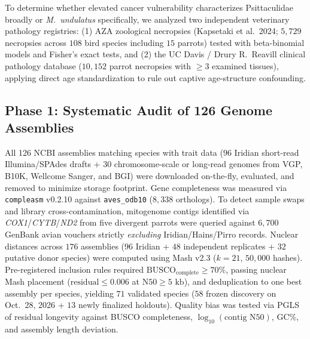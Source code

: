 \documentclass[10pt,a4paper,twocolumn]{article}
\begin{document}
To determine whether elevated cancer vulnerability characterizes Psittaculidae broadly or \textit{M.\ undulatus} specifically, we analyzed two independent veterinary pathology registries: (1) AZA zoological necropsies (Kapsetaki et al.\ 2024; $5,729$ necropsies across $108$ bird species including $15$ parrots) tested with beta-binomial models and Fisher's exact tests, and (2) the UC Davis / Drury R.\ Reavill clinical pathology database ($10,152$ parrot necropsies with $\ge 3$ examined tissues), applying direct age standardization to rule out captive age-structure confounding.

\subsection{Phase 1: Systematic Audit of 126 Genome Assemblies}
All 126 NCBI assemblies matching species with trait data ($96$ Iridian short-read Illumina/SPAdes drafts + $30$ chromosome-scale or long-read genomes from VGP, B10K, Wellcome Sanger, and BGI) were downloaded on-the-fly, evaluated, and removed to minimize storage footprint. Gene completeness was measured via \texttt{compleasm} v0.2.10 against \texttt{aves\_odb10} ($8,338$ orthologs). To detect sample swaps and library cross-contamination, mitogenome contigs identified via \textit{COX1}/\textit{CYTB}/\textit{ND2} from five divergent parrots were queried against $6,700$ GenBank avian vouchers strictly \textit{excluding} Iridian/Hains/Pirro records. Nuclear distances across $176$ assemblies ($96$ Iridian + $48$ independent replicates + $32$ putative donor species) were computed using Mash v2.3 ($k = 21$, $50,000$ hashes). Pre-registered inclusion rules required $\text{BUSCO}_{\text{complete}} \ge 70\%$, passing nuclear Mash placement ($\text{residual} \le 0.006$ at $\text{N50} \ge 5\text{ kb}$), and deduplication to one best assembly per species, yielding $71$ validated species ($58$ frozen discovery on Oct.\ 28, 2026 + $13$ newly finalized holdouts). Quality bias was tested via PGLS of residual longevity against BUSCO completeness, $\log_{10}(\text{contig N50})$, GC\%, and assembly length deviation.
\end{document}
